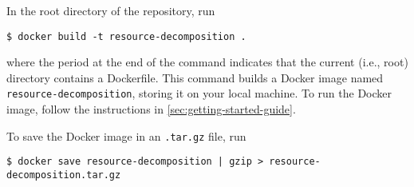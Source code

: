 In the root directory of the repository, run
\begin{verbatim}
$ docker build -t resource-decomposition .
\end{verbatim}
where the period at the end of the command indicates that the current (i.e.,
root) directory contains a Dockerfile.
%
This command builds a Docker image named \texttt{resource-decomposition},
storing it on your local machine.
%
To run the Docker image, follow the instructions in
\cref{sec:getting-started-guide}.

To save the Docker image in an \texttt{.tar.gz} file, run
\begin{verbatim}
$ docker save resource-decomposition | gzip > resource-decomposition.tar.gz
\end{verbatim}

